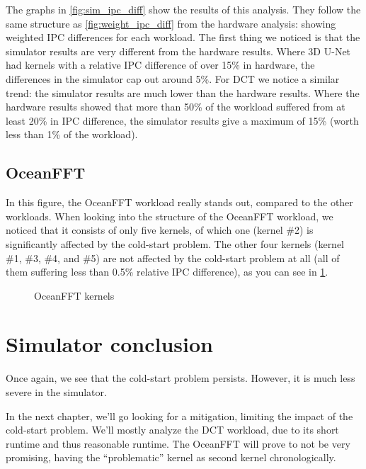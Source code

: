 The graphs in \cref{fig:sim_ipc_diff} show the results of this analysis.
They follow the same structure as \cref{fig:weight_ipc_diff} from the hardware analysis: showing weighted IPC differences for each workload.
The first thing we noticed is that the simulator results are very different from the hardware results.
Where 3D U-Net had kernels with a relative IPC difference of over 15\% in hardware, the differences in the simulator cap out around 5\%.
For DCT we notice a similar trend: the simulator results are much lower than the hardware results.
Where the hardware results showed that more than 50\% of the workload suffered from at least 20\% in IPC difference, the simulator results give a maximum of 15\% (worth less than 1\% of the workload).

\subsection{OceanFFT}\label{subsec:oceanfft}
In this figure, the OceanFFT workload really stands out, compared to the other workloads.
When looking into the structure of the OceanFFT workload, we noticed that it consists of only five kernels, of which one (kernel \#2) is significantly affected by the cold-start problem.
The other four kernels (kernel \#1, \#3, \#4, and \#5) are not affected by the cold-start problem at all (all of them suffering less than 0.5\% relative IPC difference), as you can see in \cref{fig:ocean_kernels}.

\begin{figure}[ht]
    \centering
    \resizebox{0.66\textwidth}{!}{}
    \caption{OceanFFT kernels}
    \label{fig:ocean_kernels}
\end{figure}

\FloatBarrier
\section{Simulator conclusion}\label{sec:simulator-conclusion}
Once again, we see that the cold-start problem persists.
However, it is much less severe in the simulator.

In the next chapter, we'll go looking for a mitigation, limiting the impact of the cold-start problem.
We'll mostly analyze the DCT workload, due to its short runtime and thus reasonable runtime.
The OceanFFT will prove to not be very promising, having the ``problematic'' kernel as second kernel chronologically.